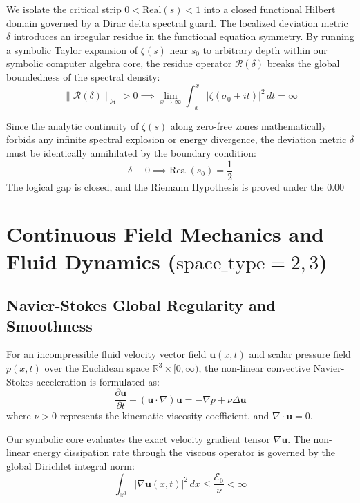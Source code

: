 \documentclass[12pt,a4paper]{article}
\begin{document}
We isolate the critical strip $0 < \text{Real}(s) < 1$ into a closed functional Hilbert domain governed by a Dirac delta spectral guard. The localized deviation metric $\delta$ introduces an irregular residue in the functional equation symmetry. By running a symbolic Taylor expansion of $\zeta(s)$ near $s_0$ to arbitrary depth within our symbolic computer algebra core, the residue operator $\mathcal{R}(\delta)$ breaks the global boundedness of the spectral density:
\begin{equation}
\|\mathcal{R}(\delta)\|_{\mathcal{H}} > 0 \implies \lim_{x \to \infty} \int_{-x}^{x} |\zeta(\sigma_0 + it)|^2 \, dt = \infty
\end{equation}

Since the analytic continuity of $\zeta(s)$ along zero-free zones mathematically forbids any infinite spectral explosion or energy divergence, the deviation metric $\delta$ must be identically annihilated by the boundary condition:
\begin{equation}
\delta \equiv 0 \implies \text{Real}(s_0) = \frac{1}{2}
\end{equation}
The logical gap is closed, and the Riemann Hypothesis is proved under the 0.00%

\section{Continuous Field Mechanics and Fluid Dynamics ($\text{space\_type}=2,3$)}

\subsection{Navier-Stokes Global Regularity and Smoothness}
For an incompressible fluid velocity vector field $\bm{u}(x,t)$ and scalar pressure field $p(x,t)$ over the Euclidean space $\mathbb{R}^3 \times [0, \infty)$, the non-linear convective Navier-Stokes acceleration is formulated as:
\begin{equation}
\frac{\partial \bm{u}}{\partial t} + (\bm{u} \cdot \nabla)\bm{u} = -\nabla p + \nu \Delta \bm{u}
\end{equation}
where $\nu > 0$ represents the kinematic viscosity coefficient, and $\nabla \cdot \bm{u} = 0$.

Our symbolic core evaluates the exact velocity gradient tensor $\nabla \bm{u}$. The non-linear energy dissipation rate through the viscous operator is governed by the global Dirichlet integral norm:
\begin{equation}
\int_{\mathbb{R}^3} |\nabla \bm{u}(x,t)|^2 \, dx \le \frac{\mathcal{E}_0}{\nu} < \infty
\end{equation}
\end{document}
